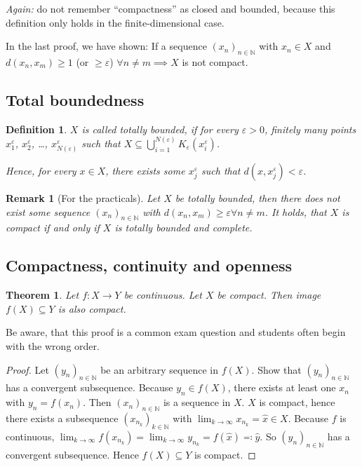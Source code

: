 \documentclass{article}
\newtheorem{theorem}{Theorem}  \numberwithin{theorem}{section}
\newtheorem{definition}{Definition}  \numberwithin{definition}{section}
\newtheorem{remark}{Remark}  \numberwithin{remark}{section}
\begin{document}
\emph{Again:} do not remember \enquote{compactness} as closed and bounded, because this definition only holds in the finite-dimensional case.

In the last proof, we have shown: If a sequence $(x_n)_{n \in \mathbb N}$ with $x_n \in X$ and $d(x_n, x_m) \geq 1$ (or $\geq \varepsilon$) $\forall n \neq m \implies X$ is not compact.

\subsection{Total boundedness}

\begin{definition}
  $X$ is called totally bounded, if for every $\varepsilon > 0$, finitely many points $x_1^\varepsilon$, $x_2^\varepsilon$, \dots, $x_{N(\varepsilon)}^\varepsilon$ such that $X \subseteq \bigcup_{i=1}^{N(\varepsilon)} K_{\varepsilon}(x_i^\varepsilon)$.

  Hence, for every $x \in X$, there exists some $x_j^\varepsilon$ such that $d(x, x_j^\varepsilon) < \varepsilon$.
\end{definition}

\begin{remark}[For the practicals]
  Let $X$ be totally bounded, then there does not exist some sequence $(x_n)_{n \in \mathbb N}$ with $d(x_n, x_m) \geq \varepsilon \forall n \neq m$. It holds, that $X$ is compact if and only if $X$ is totally bounded and complete.
\end{remark}

\subsection{Compactness, continuity and openness}
\begin{theorem} %
  \label{satz6}
  Let $f: X \to Y$ be continuous. Let $X$ be compact. Then image $f(X) \subseteq Y$ is also compact.
\end{theorem}

Be aware, that this proof is a common exam question and students often begin with the wrong order.

\begin{proof}
  Let $(y_n)_{n \in \mathbb N}$ be an arbitrary sequence in $f(X)$. Show that $(y_n)_{n\in\mathbb N}$ has a convergent subsequence.
  Because $y_n \in f(X)$, there exists at least one $x_n$ with $y_n = f(x_n)$.
  Then $(x_n)_{n \in \mathbb N}$ is a sequence in $X$. $X$ is compact, hence there exists a subsequence $(x_{n_k})_{k \in \mathbb N}$ with $\lim_{k\to\infty} x_{n_k} = \hat{x} \in X$. Because $f$ is continuous, $\lim_{k\to\infty} f(x_{n_k}) = \lim_{k\to\infty} y_{n_k} = f(\hat{x}) \eqqcolon \hat{y}$.
  So $(y_n)_{n\in\mathbb N}$ has a convergent subsequence. Hence $f(X) \subseteq Y$ is compact.
\end{proof}
\end{document}
